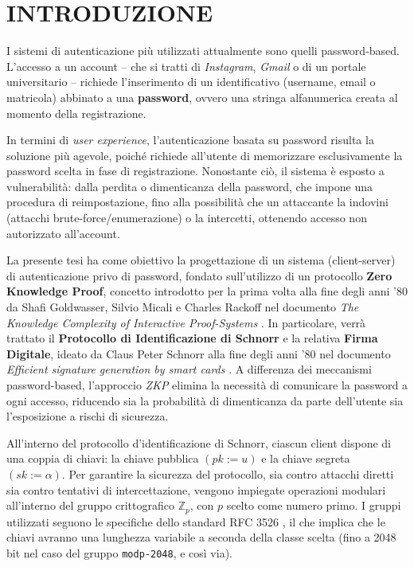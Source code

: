 \chapter*{INTRODUZIONE}


I sistemi di autenticazione più utilizzati attualmente sono quelli password-based. L'accesso a un account – che si tratti di \textit{Instagram}, \textit{Gmail} o di un portale universitario – richiede l'inserimento di un identificativo (username, email o matricola) abbinato a una \textbf{password}, ovvero una stringa alfanumerica creata al momento della registrazione.

In termini di \textit{user experience}, l'autenticazione basata su password risulta la soluzione più agevole, poiché richiede all'utente di memorizzare esclusivamente la password scelta in fase di registrazione. Nonostante ciò, il sistema è esposto a vulnerabilità: dalla perdita o dimenticanza della password, che impone una procedura di reimpostazione, fino alla possibilità che un attaccante la indovini (attacchi brute-force/enumerazione) o la intercetti, ottenendo accesso non autorizzato all'account.

La presente tesi ha come obiettivo la progettazione di un sistema (client-server) di autenticazione privo di password, fondato sull'utilizzo di un protocollo \textbf{Zero Knowledge Proof}, concetto introdotto per la prima volta alla fine degli anni '80 da Shafi Goldwasser, Silvio Micali e Charles Rackoff nel documento \textit{The Knowledge Complexity of Interactive Proof-Systems} \cite{doi:10.1137/0218012}. In particolare, verrà trattato il \textbf{Protocollo di Identificazione di Schnorr} e la relativa \textbf{Firma Digitale}, ideato da Claus Peter Schnorr alla fine degli anni '80 nel documento \textit{Efficient signature generation by smart cards} \cite{Schnorr2005}. A differenza dei meccanismi password-based, l'approccio \textit{ZKP} elimina la necessità di comunicare la password a ogni accesso, riducendo sia la probabilità di dimenticanza da parte dell'utente sia l'esposizione a rischi di sicurezza.

All'interno del protocollo d'identificazione di Schnorr, ciascun client dispone di una coppia di chiavi: la chiave pubblica $(pk := u)$ e la chiave segreta $(sk := \alpha)$.
Per garantire la sicurezza del protocollo, sia contro attacchi diretti sia contro tentativi di intercettazione, vengono impiegate operazioni modulari all'interno del gruppo crittografico $\mathbb{Z}_p$, con $p$ scelto come numero primo. I gruppi utilizzati seguono le specifiche dello standard RFC 3526 \cite{rfc3526}, il che implica che le chiavi avranno una lunghezza variabile a seconda della classe scelta (fino a 2048 bit nel caso del gruppo \texttt{modp-2048}, e così via).

